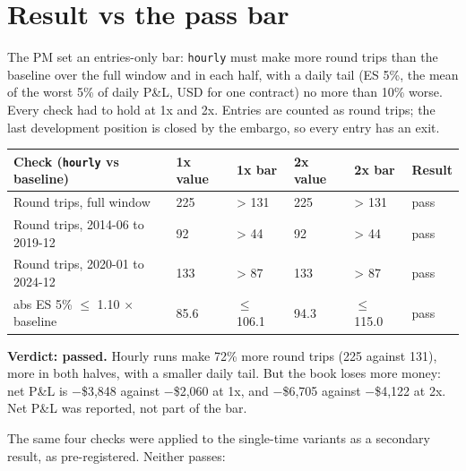 \documentclass{article}
\begin{document}
\section{Result vs the pass bar}

The PM set an entries-only bar: \texttt{hourly} must make more round trips than the baseline over the full window and in each half, with a daily tail (ES 5\%, the mean of the worst 5\% of daily P\&L, USD for one contract) no more than 10\% worse. Every check had to hold at 1x and 2x. Entries are counted as round trips; the last development position is closed by the embargo, so every entry has an exit.

\begin{center}\small
\begin{tabularx}{\linewidth}{>{\raggedright\arraybackslash}X l l l l l}
\toprule
\textbf{Check (\texttt{hourly} vs baseline)} & \textbf{1x value} & \textbf{1x bar} & \textbf{2x value} & \textbf{2x bar} & \textbf{Result} \\
\midrule
Round trips, full window & 225 & > 131 & 225 & > 131 & pass \\
Round trips, 2014-06 to 2019-12 & 92 & > 44 & 92 & > 44 & pass \\
Round trips, 2020-01 to 2024-12 & 133 & > 87 & 133 & > 87 & pass \\
abs ES 5\% \ensuremath{\leq} 1.10 \ensuremath{\times} baseline & 85.6 & \ensuremath{\leq} 106.1 & 94.3 & \ensuremath{\leq} 115.0 & pass \\
\bottomrule
\end{tabularx}
\end{center}

\textbf{Verdict: passed.} Hourly runs make 72\% more round trips (225 against 131), more in both halves, with a smaller daily tail. But the book loses more money: net P\&L is \ensuremath{-}\$3,848 against \ensuremath{-}\$2,060 at 1x, and \ensuremath{-}\$6,705 against \ensuremath{-}\$4,122 at 2x. Net P\&L was reported, not part of the bar.

The same four checks were applied to the single-time variants as a secondary result, as pre-registered. Neither passes:
\end{document}
